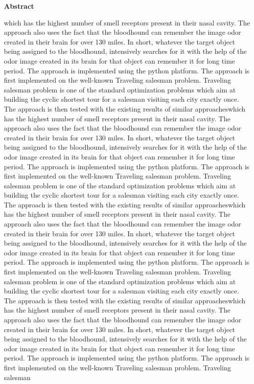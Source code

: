 \thispagestyle{empty}
\newpage
\cleardoublepage{}
{}
\begin{center}
{\Large \bf Abstract}\\
\end{center}
\vspace{10pt}

which has the highest number of smell receptors present in their nasal cavity. The approach also uses the fact that the bloodhound can remember the image odor created in their brain for over 130 miles. In short, whatever the target object being assigned to the bloodhound, intensively searches for it with the help of the odor image created in its brain for that object can remember it for long time period. The approach is implemented using the python platform. The approach is first implemented on the well-known Traveling salesman problem. Traveling salesman problem is one of the standard optimization problems which aim at building the cyclic shortest tour for a salesman visiting each city exactly once. The approach is then tested with the existing results of similar approacheswhich has the highest number of smell receptors present in their nasal cavity. The approach also uses the fact that the bloodhound can remember the image odor created in their brain for over 130 miles. In short, whatever the target object being assigned to the bloodhound, intensively searches for it with the help of the odor image created in its brain for that object can remember it for long time period. The approach is implemented using the python platform. The approach is first implemented on the well-known Traveling salesman problem. Traveling salesman problem is one of the standard optimization problems which aim at building the cyclic shortest tour for a salesman visiting each city exactly once. The approach is then tested with the existing results of similar approacheswhich has the highest number of smell receptors present in their nasal cavity. The approach also uses the fact that the bloodhound can remember the image odor created in their brain for over 130 miles. In short, whatever the target object being assigned to the bloodhound, intensively searches for it with the help of the odor image created in its brain for that object can remember it for long time period. The approach is implemented using the python platform. The approach is first implemented on the well-known Traveling salesman problem. Traveling salesman problem is one of the standard optimization problems which aim at building the cyclic shortest tour for a salesman visiting each city exactly once. The approach is then tested with the existing results of similar approacheswhich has the highest number of smell receptors present in their nasal cavity. The approach also uses the fact that the bloodhound can remember the image odor created in their brain for over 130 miles. In short, whatever the target object being assigned to the bloodhound, intensively searches for it with the help of the odor image created in its brain for that object can remember it for long time period. The approach is implemented using the python platform. The approach is first implemented on the well-known Traveling salesman problem. Traveling salesman 
